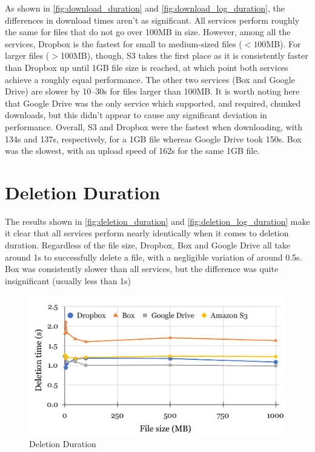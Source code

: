 As shown in \autoref{fig:download_duration} and \autoref{fig:download_log_duration}, the differences in download times aren't as significant. All services perform roughly the same for files that do not go over 100MB in size. However, among all the services, Dropbox is the fastest for small to medium-sized files ($< 100$MB). For larger files ($ >$100MB), though, S3 takes the first place as it is consistently faster than Dropbox up until 1GB file size is reached, at which point both services achieve a roughly equal performance. The other two services (Box and Google Drive) are slower by 10--30s for files larger than 100MB. It is worth noting here that Google Drive was the only service which supported, and required, chunked downloads, but this didn't appear to cause any significant deviation in performance. Overall, S3 and Dropbox were the fastest when downloading, with 134s and 137s, respectively, for a 1GB file whereas Google Drive took 150s. Box was the slowest, with an upload speed of 162s for the same 1GB file.


\pagebreak

\section{Deletion Duration}
The results shown in \autoref{fig:deletion_duration} and \autoref{fig:deletion_log_duration} make it clear that all services perform nearly identically when it comes to deletion duration. Regardless of the file size, Dropbox, Box and Google Drive all take around 1s to successfully delete a file, with a negligible variation of around 0.5s. Box was consistently slower than all services, but the difference was quite insignificant (usually less than 1s)

\begin{figure} [!h]
    \centering
    \includegraphics[scale=0.6]{images/deletion_chart}
    \caption{\label{fig:deletion_duration}Deletion Duration}
\end{figure}

